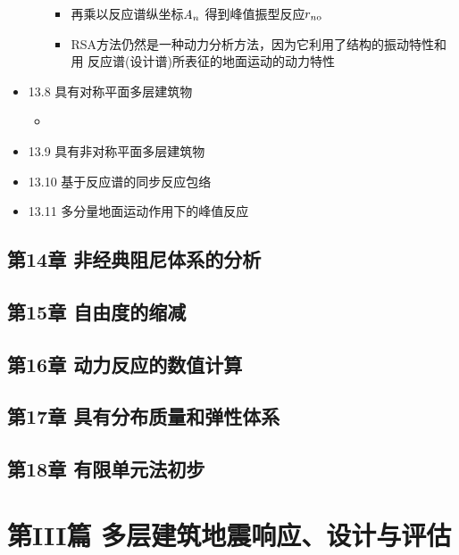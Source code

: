 \documentclass[11pt]{article}
\begin{document}
\begin{itemize}
\begin{itemize}
\begin{itemize}
\item 再乘以反应谱纵坐标\(\mathit{A}_{n}\) 得到峰值振型反应\(r_{n\mathrm{o}}\)
\item RSA方法仍然是一种动力分析方法，因为它利用了结构的振动特性和用
反应谱(设计谱)所表征的地面运动的动力特性
\end{itemize}
\end{itemize}
\item 13.8 具有对称平面多层建筑物
\label{sec:org4b82aa6}
\begin{itemize}
\item 
\end{itemize}
\item 13.9 具有非对称平面多层建筑物
\label{sec:org48291cc}
\item 13.10 基于反应谱的同步反应包络
\label{sec:orgf40de6c}
\item 13.11 多分量地面运动作用下的峰值反应
\label{sec:org3bae673}
\end{itemize}
\subsection*{第14章 非经典阻尼体系的分析}
\label{sec:org003d593}
\subsection*{第15章 自由度的缩减}
\label{sec:orgdec7f81}
\subsection*{第16章 动力反应的数值计算}
\label{sec:orgc3804cf}
\subsection*{第17章 具有分布质量和弹性体系}
\label{sec:org87cd1d3}
\subsection*{第18章 有限单元法初步}
\label{sec:orge0a4350}
\section*{第III篇 多层建筑地震响应、设计与评估}
\label{sec:orgf9517f8}
\end{document}

